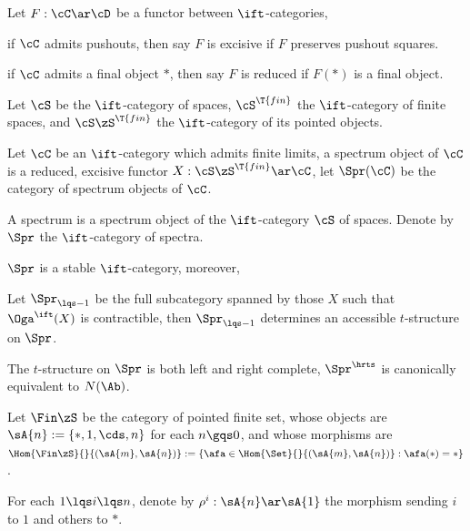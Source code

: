 \documentclass[a4paper, twoside]{article}
\begin{document}
\begin{dfn}[1.4.2.1]
    Let $F:\cC\ar\cD$ be a functor between $\ift$-categories,
    \begin{enr}[label=(\arabic*)]
        \item if $\cC$ admits pushouts, then say $F$ is excisive if $F$ preserves pushout squares.
        \item if $\cC$ admits a final object $*$, then say $F$ is reduced if $F(*)$ is a final object.
    \end{enr}
\end{dfn}


\begin{dfn}[1.4.2.5, 1.4.2.8, 1.4.3.1]
    Let $\cS$ be the $\ift$-category of spaces, $\cS^{\T{fin}}$ the $\ift$-category of finite spaces, and $\cS\zS^{\T{fin}}$ the $\ift$-category of its pointed objects.

    Let $\cC$ be an $\ift$-category which admits finite limits, a spectrum object of $\cC$ is a reduced, excisive functor $X:\cS\zS^{\T{fin}}\ar\cC$, let $\Spr(\cC)$ be the category of spectrum objects of $\cC$.

    A spectrum is a spectrum object of the $\ift$-category $\cS$ of spaces. Denote by $\Spr$ the $\ift$-category of spectra.
\end{dfn}

\begin{thm}[1.4.3.6]
    $\Spr$ is a stable $\ift$-category, moreover,
    \begin{enr}[label=(\arabic*)]
        \item Let $\Spr_{\lqs-1}$ be the full subcategory spanned by those $X$ such that $\Oga^{\ift}(X)$ is contractible, then $\Spr_{\lqs-1}$ determines an accessible $t$-structure on $\Spr$.
        \item The $t$-structure on $\Spr$ is both left and right complete, $\Spr^{\hrts}$ is canonically equivalent to $N(\Ab)$.
    \end{enr}
\end{thm}


\begin{dfn}[2.0.0.2]
    Let $\Fin\zS$ be the category of pointed finite set, whose objects are $\sA{n}:=\{*,1,\cds,n\}$ for each $n\gqs0$, and whose morphisms are $\Hom{\Fin\zS}{}{(\sA{m},\sA{n})}:=\{\afa\in\Hom{\Set}{}{(\sA{m},\sA{n})}:\afa(*)=*\}$.

    For each $1\lqs i\lqs n$, denote by $\rho^{i}:\sA{n}\ar\sA{1}$ the morphism sending $i$ to $1$ and others to $*$.
\end{dfn}
\end{document}
